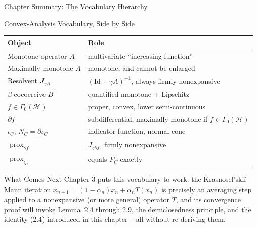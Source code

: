 \documentclass[aspectratio=169,10pt]{beamer}
\newcommand{\Id}{\mathrm{Id}}
\begin{document}
\begin{frame}[allowframebreaks]{Chapter Summary: The Vocabulary Hierarchy}
  \begin{block}{Convex-Analysis Vocabulary, Side by Side}
    \centering
    \begin{tabular}{ll}
      \toprule
      \textbf{Object} & \textbf{Role} \\
      \midrule
      Monotone operator $A$ & multivariate ``increasing function'' \\
      Maximally monotone $A$ & monotone, and cannot be enlarged \\
      Resolvent $J_{\gamma A}$ & $(\Id+\gamma A)^{-1}$, always firmly nonexpansive \\
      $\beta$-cocoercive $B$ & quantified monotone + Lipschitz \\
      $f \in \Gamma_0(\mathcal{H})$ & proper, convex, lower semi-continuous \\
      $\partial f$ & subdifferential; maximally monotone if $f\in\Gamma_0(\mathcal H)$ \\
      $\iota_C$, $N_C=\partial \iota_C$ & indicator function, normal cone \\
      $\operatorname{prox}_{\gamma f}$ & $J_{\gamma \partial f}$, firmly nonexpansive \\
      $\operatorname{prox}_{\iota_C}$ & equals $P_C$ exactly \\
      \bottomrule
    \end{tabular}
  \end{block}

  \begin{alertblock}{What Comes Next}
    Chapter 3 puts this vocabulary to work: the Krasnosel'ski\u{i}--Mann
    iteration $x_{n+1} = (1-\alpha_n)x_n + \alpha_n T(x_n)$ is precisely an
    averaging step applied to a nonexpansive (or more general) operator $T$,
    and its convergence proof will invoke Lemma~2.4 through 2.9, the
    demiclosedness principle, and the identity (2.4) introduced in this
    chapter -- all without re-deriving them.
  \end{alertblock}

\end{frame}
\end{document}
